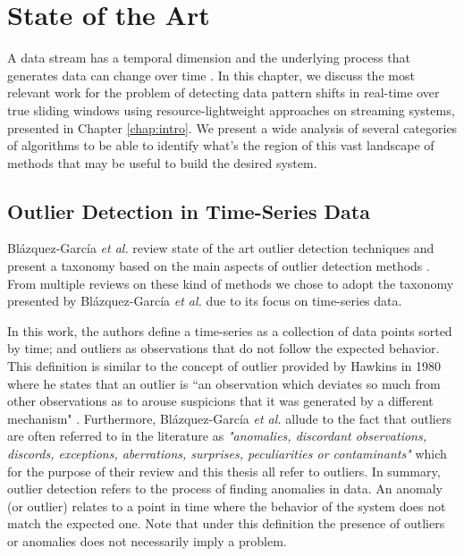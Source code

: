 \chapter{State of the Art} \label{chap:sota} \minitoc

A data stream has a temporal dimension and the underlying process that generates data can change over time \cite{Aggarwal-Evolving-Data-Streams, Domingos-Mining-Time-Data-Streams}. In this chapter, we discuss the most relevant work for the problem of detecting data pattern shifts in real-time over true sliding windows using resource-lightweight approaches on streaming systems, presented in Chapter \ref{chap:intro}. We present a wide analysis of several categories of algorithms to be able to identify what's the region of this vast landscape of methods that may be useful to build the desired system. 

\section{Outlier Detection in Time-Series Data} \label{sec:outliers}
Blázquez-García \emph{et al.} review state of the art outlier detection techniques and present a taxonomy based on the main aspects of outlier detection methods \cite{Blazquez-Garcia-Review-Anomaly-Detection}. From multiple reviews on these kind of methods \cite{Aggarwal-Outlier-survey, Aguinis-Outlier-survey, Chandola-Outlier-survey-2009, Hodge-Outlier-survey, Xu-outlier-survey-2019} we chose to adopt the taxonomy presented by Blázquez-García \emph{et al.} due to its focus on time-series data.

In this work, the authors define a time-series as a collection of data points sorted by time; and outliers as observations that do not follow the expected behavior. This definition is similar to the concept of outlier provided by Hawkins in 1980 where he states that an outlier is “an observation which deviates so much from other observations as to arouse suspicions that it was
generated by a different mechanism" \cite{Hawkins-Outliers}. Furthermore, Blázquez-García \emph{et al.} allude to the fact that outliers are often referred to in the literature as \textit{"anomalies, discordant observations, discords, exceptions, aberrations, surprises, peculiarities or contaminants"} which for the purpose of their review and this thesis all refer to outliers. In summary, outlier detection refers to the process of finding anomalies in data. An anomaly (or outlier) relates to a point in time where the behavior of the system does not match the expected one. Note that under this definition the presence of outliers or anomalies does not necessarily imply a problem. 

